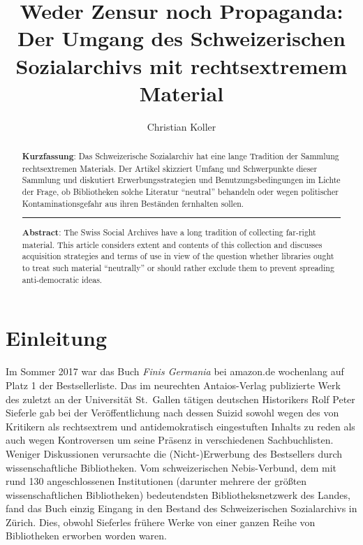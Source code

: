 \documentclass[a4paper,
fontsize=11pt,
oneside,
numbers=noperiodatend,
parskip=half-,
bibliography=totoc,
final
]{scrartcl}
\title{\LARGE{Weder Zensur noch Propaganda: Der Umgang des Schweizerischen Sozialarchivs mit rechtsextremem Material}}%
\author{Christian Koller} %
\date{}
\begin{document}
\maketitle
\thispagestyle{fancyplain} 

\begin{abstract}
\textbf{Kurzfassung}: Das Schweizerische Sozialarchiv hat eine lange
Tradition der Sammlung rechtsextremen Materials. Der Artikel skizziert
Umfang und Schwerpunkte dieser Sammlung und diskutiert
Erwerbungsstrategien und Benutzungsbedingungen im Lichte der Frage, ob
Bibliotheken solche Literatur \enquote{neutral} behandeln oder wegen politischer
Kontaminationsgefahr aus ihren Beständen fernhalten sollen.

\begin{center}\rule{0.5\linewidth}{\linethickness}\end{center}

\textbf{Abstract}: The Swiss Social Archives have a long tradition of
collecting far-right material. This article considers extent and
contents of this collection and discusses acquisition strategies and
terms of use in view of the question whether libraries ought to treat
such material \enquote{neutrally} or should rather exclude them to prevent
spreading anti-democratic ideas.
\end{abstract}

\hypertarget{einleitung}{%
\section*{Einleitung}\label{einleitung}}

Im Sommer 2017 war das Buch \emph{Finis Germania} bei amazon.de
wochenlang auf Platz 1 der Bestsellerliste. Das im neurechten
Antaios-Verlag publizierte Werk des zuletzt an der Universität
St.~Gallen tätigen deutschen Historikers Rolf Peter Sieferle gab bei der
Veröffentlichung nach dessen Suizid sowohl wegen des von Kritikern als
rechtsextrem und antidemokratisch eingestuften Inhalts zu reden als auch
wegen Kontroversen um seine Präsenz in verschiedenen Sachbuchlisten.
Weniger Diskussionen verursachte die (Nicht-)Erwerbung des Bestsellers
durch wissenschaftliche Bibliotheken. Vom schweizerischen Nebis-Verbund,
dem mit rund 130 angeschlossenen Institutionen (darunter mehrere der
größten wissenschaftlichen Bibliotheken) bedeutendsten
Bibliotheksnetzwerk des Landes, fand das Buch einzig Eingang in den
Bestand des Schweizerischen Sozialarchivs in Zürich. Dies, obwohl
Sieferles frühere Werke von einer ganzen Reihe von Bibliotheken erworben
worden waren.
\end{document}
